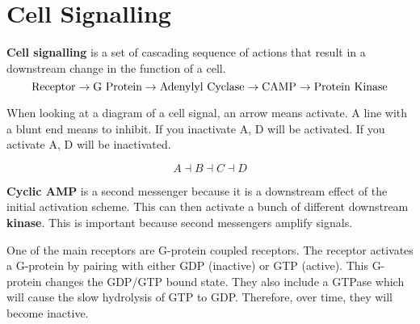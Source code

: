 \documentclass{article}
\begin{document}
\section{Cell Signalling}

\textbf{Cell signalling} is a set of cascading sequence of actions that result in a downstream change in the function of a cell.
$$\rm{Receptor \rightarrow G\ Protein \rightarrow Adenylyl\ Cyclase \rightarrow CAMP \rightarrow Protein\ Kinase}$$

When looking at a diagram of a cell signal, an arrow means activate. A line with a blunt end means to inhibit. If you inactivate A, D will be activated. If you activate A, D will be inactivated.

$$A \dashv B \dashv C \dashv D$$

\textbf{Cyclic AMP} is a second messenger because it is a downstream effect of the initial activation scheme. This can then activate a bunch of different downstream \textbf{kinase}. This is important because second messengers amplify signals.

One of the main receptors are G-protein coupled receptors. The receptor activates a G-protein by pairing with either GDP (inactive) or GTP (active). This G-protein changes the GDP/GTP bound state. They also include a GTPase which will cause the slow hydrolysis of GTP to GDP. Therefore, over time, they will become inactive.
\end{document}
